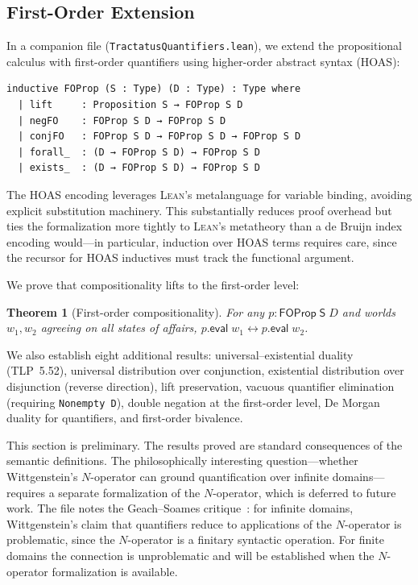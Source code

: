 \documentclass[10pt, letterpaper]{article}
\newtheorem{theorem}{Theorem}[section]
\theoremstyle{definition}
\theoremstyle{remark}
\newcommand{\Sach}{\mathsf{S}}
\newcommand{\eval}{\mathsf{eval}}
\newcommand{\Lean}{\textsc{Lean}}
\begin{document}
\subsection{First-Order Extension}
\label{sec:firstorder}

In a companion file (\texttt{TractatusQuantifiers.lean}), we
extend the propositional calculus with first-order quantifiers
using higher-order abstract syntax (HOAS):

\begin{lstlisting}
inductive FOProp (S : Type) (D : Type) : Type where
  | lift     : Proposition S → FOProp S D
  | negFO    : FOProp S D → FOProp S D
  | conjFO   : FOProp S D → FOProp S D → FOProp S D
  | forall_  : (D → FOProp S D) → FOProp S D
  | exists_  : (D → FOProp S D) → FOProp S D
\end{lstlisting}

\noindent
The HOAS encoding leverages \Lean's metalanguage for variable
binding, avoiding explicit substitution machinery.  This
substantially reduces proof overhead but ties the formalization
more tightly to \Lean's metatheory than a de Bruijn index
encoding would---in particular, induction over HOAS terms
requires care, since the recursor for HOAS inductives must track
the functional argument.

We prove that compositionality lifts to the first-order level:

\begin{theorem}[First-order compositionality]
\label{thm:fo-comp}
For any $p : \mathsf{FOProp}\;\Sach\;D$ and worlds $w_1, w_2$
agreeing on all states of affairs, $p.\eval\;w_1 \leftrightarrow
p.\eval\;w_2$.
\end{theorem}

\noindent
We also establish eight additional results: universal--existential
duality (TLP~5.52), universal distribution over conjunction,
existential distribution over disjunction (reverse direction),
lift preservation, vacuous quantifier elimination (requiring
\texttt{Nonempty D}), double negation at the first-order level,
De Morgan duality for quantifiers, and first-order bivalence.

This section is preliminary.  The results proved are standard
consequences of the semantic definitions.  The philosophically
interesting question---whether Wittgenstein's $N$-operator can
ground quantification over infinite domains---requires a
separate formalization of the $N$-operator, which is deferred to
future work.  The file notes the
Geach--Soames critique~\cite{geach1981,soames1983}: for infinite
domains, Wittgenstein's claim that quantifiers reduce to
applications of the $N$-operator is problematic, since the
$N$-operator is a finitary syntactic operation.  For finite
domains the connection is unproblematic and will be established
when the $N$-operator formalization is available.
\end{document}
